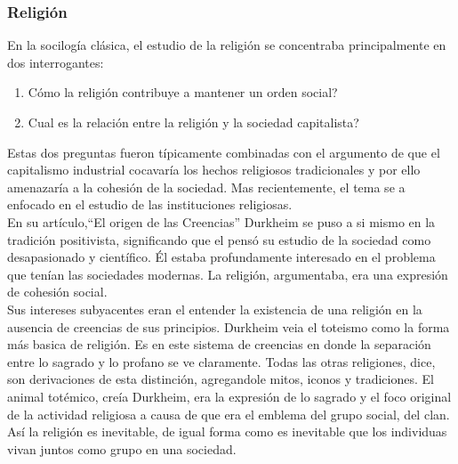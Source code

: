 \subsubsection{Religi\'on}
En la socilog\'ia cl\'asica, el estudio de la religi\'on se concentraba principalmente en dos interrogantes:
\begin{enumerate}
	\item C\'omo la religi\'on contribuye a mantener un orden social? 
	\item Cual es la relaci\'on entre la religi\'on y la sociedad capitalista?
\end{enumerate}
Estas dos preguntas fueron t\'ipicamente combinadas con el argumento de que el capitalismo industrial cocavar\'ia los hechos religiosos tradicionales y por ello amenazar\'ia a la cohesi\'on de la sociedad.
Mas recientemente, el tema se a enfocado en el estudio de las instituciones religiosas. \\
En su art\'iculo,``El origen de las Creencias'' Durkheim se puso a si mismo en la tradici\'on positivista, significando que el pens\'o su estudio de la sociedad como desapasionado y cient\'ifico.
\'El estaba profundamente interesado en el problema que ten\'ian las sociedades modernas.
La religi\'on, argumentaba, era una expresi\'on de cohesi\'on social. \\

Sus intereses subyacentes eran el entender la existencia de una religi\'on en la ausencia de creencias de sus principios.
Durkheim veia el toteismo como la forma m\'as basica de religi\'on.
Es en este sistema de creencias en donde la separaci\'on entre lo sagrado y lo profano se ve claramente.
Todas las otras religiones, dice, son derivaciones de esta distinci\'on, agregandole mitos, iconos y tradiciones.
El animal tot\'emico, cre\'ia Durkheim, era la expresi\'on de lo sagrado y el foco original de la actividad religiosa a causa de que era el emblema del grupo social, del clan.
As\'i la religi\'on es inevitable, de igual forma como es inevitable que los individuas vivan juntos como grupo en una sociedad.\\


